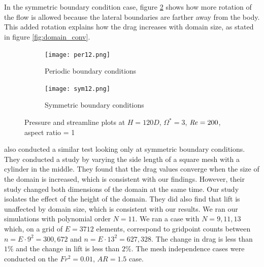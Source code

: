 \\\\In the symmetric boundary condition case, figure \ref{fig:sym12} shows how more rotation of the flow is allowed because the lateral boundaries are farther away from the body. This added rotation explains how the drag increases with domain size, as stated in figure \ref{fig:domain_conv}.  
\begin{figure}
    \centering
    \begin{subfigure}{0.49\textwidth}
    \texttt{[image: per12.png]}
    \caption{Periodic boundary conditions}
    \label{fig:per12}
    \end{subfigure}
    \begin{subfigure}{0.49\textwidth}
    \texttt{[image: sym12.png]}
    \caption{Symmetric boundary conditions}
    \label{fig:sym12}
    \end{subfigure}
    \caption{Pressure and streamline plots at $H=120D$, $\Omega^{\ast} = 3$, $\mathit{Re} = 200$, aspect ratio = 1}
    \label{fig:per sym12}
\end{figure}
\cite{mittal_flow_2003} also conducted a similar test looking only at symmetric boundary conditions. They conducted a study by varying the side length of a square mesh with a cylinder in the middle. They found that the drag values converge when the size of the domain is increased, which is consistent with our findings. However, their study changed both dimensions of the domain at the same time. Our study isolates the effect of the height of the domain. They did also find that lift is unaffected by domain size, which is consistent with our results. We ran our simulations with polynomial order $N = 11$. We ran a case with $N = 9, 11, 13$ which, on a grid of $E = 3712$ elements, correspond to gridpoint counts between $n = E \cdot 9^2 = 300,672$ and $n = E \cdot 13^2 = 627,328$. The change in drag is less than $1\%$ and the change in lift is less than $2\%$. The mesh independence cases were conducted on the $Fr^2 = 0.01$, $AR = 1.5$ case.

